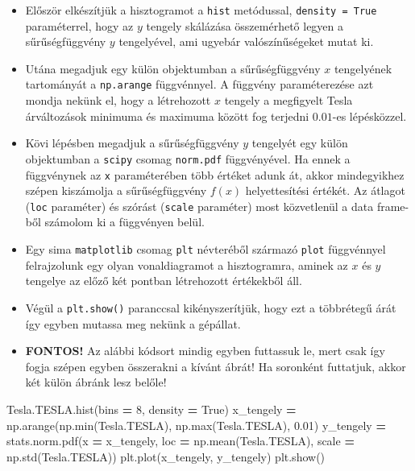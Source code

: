 \documentclass[
]{book}
\newenvironment{Shaded}{\begin{snugshade}}{\end{snugshade}}
\newcommand{\BuiltInTok}[1]{#1}
\newcommand{\DecValTok}[1]{\textcolor[rgb]{0.00,0.00,0.81}{#1}}
\newcommand{\FloatTok}[1]{\textcolor[rgb]{0.00,0.00,0.81}{#1}}
\newcommand{\NormalTok}[1]{#1}
\newcommand{\OperatorTok}[1]{\textcolor[rgb]{0.81,0.36,0.00}{\textbf{#1}}}
\newcommand{\VariableTok}[1]{\textcolor[rgb]{0.00,0.00,0.00}{#1}}
\providecommand{\tightlist}{%
  \setlength{\itemsep}{0pt}\setlength{\parskip}{0pt}}
\begin{document}
\begin{itemize}
\tightlist
\item
  Először elkészítjük a hisztogramot a \texttt{hist} metódussal, \texttt{density\ =\ True} paraméterrel, hogy az \(y\) tengely skálázása összemérhető legyen a sűrűségfüggvény \(y\) tengelyével, ami ugyebár valószínűségeket mutat ki.
\item
  Utána megadjuk egy külön objektumban a sűrűségfüggvény \(x\) tengelyének tartományát a \texttt{np.arange} függvénnyel. A függvény paraméterezése azt mondja nekünk el, hogy a létrehozott \(x\) tengely a megfigyelt Tesla árváltozások minimuma és maximuma között fog terjedni \(0.01\)-es lépésközzel.
\item
  Kövi lépésben megadjuk a sűrűségfüggvény \(y\) tengelyét egy külön objektumban a \texttt{scipy} csomag \texttt{norm.pdf} függvényével. Ha ennek a függvénynek az \texttt{x} paraméterében több értéket adunk át, akkor mindegyikhez szépen kiszámolja a sűrűségfüggvény \(f(x)\) helyettesítési értékét. Az átlagot (\texttt{loc} paraméter) és szórást (\texttt{scale} paraméter) most közvetlenül a data frame-ből számolom ki a függvényen belül.
\item
  Egy sima \texttt{matplotlib} csomag \texttt{plt} névteréből származó \texttt{plot} függvénnyel felrajzolunk egy olyan vonaldiagramot a hisztogramra, aminek az \(x\) és \(y\) tengelye az előző két pontban létrehozott értékekből áll.
\item
  Végül a \texttt{plt.show()} paranccsal kikényszerítjük, hogy ezt a többrétegű árát így egyben mutassa meg nekünk a gépállat.
\item
  \textbf{FONTOS!} Az alábbi kódsort mindig egyben futtassuk le, mert csak így fogja szépen egyben összerakni a kívánt ábrát! Ha soronként futtatjuk, akkor két külön ábránk lesz belőle!
\end{itemize}

\begin{Shaded}
\begin{Highlighting}[]
\NormalTok{Tesla.TESLA.hist(bins }\OperatorTok{=} \DecValTok{8}\NormalTok{, density }\OperatorTok{=} \VariableTok{True}\NormalTok{)}
\NormalTok{x\_tengely }\OperatorTok{=}\NormalTok{ np.arange(np.}\BuiltInTok{min}\NormalTok{(Tesla.TESLA), np.}\BuiltInTok{max}\NormalTok{(Tesla.TESLA), }\FloatTok{0.01}\NormalTok{)}
\NormalTok{y\_tengely }\OperatorTok{=}\NormalTok{ stats.norm.pdf(x }\OperatorTok{=}\NormalTok{ x\_tengely, loc }\OperatorTok{=}\NormalTok{ np.mean(Tesla.TESLA), scale }\OperatorTok{=}\NormalTok{ np.std(Tesla.TESLA))}
\NormalTok{plt.plot(x\_tengely, y\_tengely)}
\NormalTok{plt.show()}
\end{Highlighting}
\end{Shaded}
\end{document}
